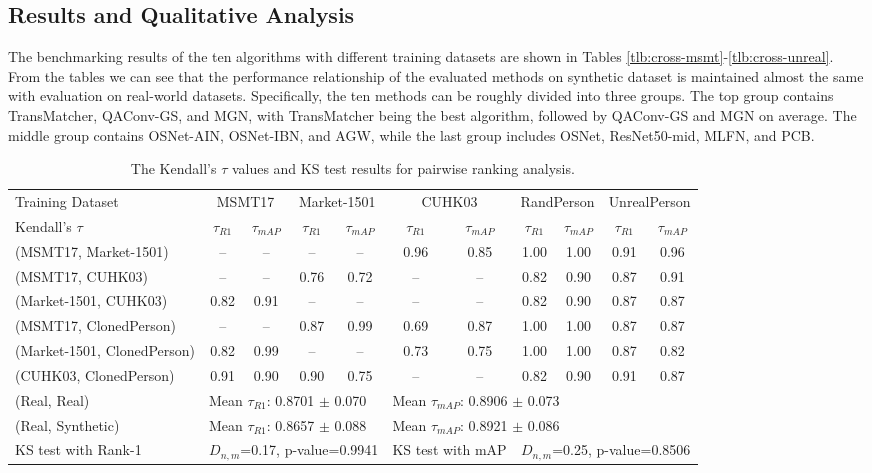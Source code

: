 \documentclass[10pt,twocolumn,letterpaper]{article}
\begin{document}
\subsection{Results and Qualitative Analysis}

The benchmarking results of the ten algorithms with different training datasets are shown in Tables \ref{tlb:cross-msmt}-\ref{tlb:cross-unreal}.
From the tables we can see that the performance relationship of the evaluated methods on synthetic dataset is maintained almost the same with evaluation on real-world datasets. Specifically, the ten methods can be roughly divided into three groups. The top group contains TransMatcher, QAConv-GS, and MGN, with TransMatcher being the best algorithm, followed by QAConv-GS and MGN on average. The middle group contains OSNet-AIN, OSNet-IBN, and AGW, while the last group includes OSNet, ResNet50-mid, MLFN, and PCB.



\begin{table*}
\centering
\begin{tabular}{|l@{}|c c|c c|c c|c c|c c|}
\hline
Training Dataset& \multicolumn{2}{c|}{MSMT17} & \multicolumn{2}{c|}{Market-1501}& \multicolumn{2}{c|}{CUHK03}& \multicolumn{2}{c|}{RandPerson}& \multicolumn{2}{c|}{UnrealPerson} \\ 

Kendall's $\tau$ & $\tau_{R1}$ & $\tau_{mAP}$& $\tau_{R1}$ & $\tau_{mAP}$& $\tau_{R1}$ & $\tau_{mAP}$& $\tau_{R1}$ & $\tau_{mAP}$& $\tau_{R1}$ & $\tau_{mAP}$ \\ \hline
(MSMT17, Market-1501)   & -- & -- & -- & -- & 0.96 & 0.85 & 1.00 & 1.00 & 0.91 & 0.96 \\
(MSMT17, CUHK03)       & -- & -- & 0.76 & 0.72 & -- & -- & 0.82 & 0.90 & 0.87 & 0.91 \\ 
(Market-1501, CUHK03)   & 0.82 & 0.91 & -- & -- & -- & -- & 0.82 & 0.90 & 0.87 & 0.87 \\ \hline
(MSMT17, ClonedPerson) & -- & -- & 0.87 & 0.99 & 0.69 & 0.87 & 1.00 & 1.00& 0.87 & 0.87 \\ 
(Market-1501, ClonedPerson)    & 0.82 & 0.99 & -- & -- & 0.73 & 0.75 & 1.00 & 1.00 & 0.87 & 0.82 \\ 
(CUHK03, ClonedPerson)        & 0.91 & 0.90 & 0.90 & 0.75 & -- & -- & 0.82 & 0.90 & 0.91 & 0.87 \\ 
\hline\hline
(Real, Real)         & \multicolumn{4}{l}{Mean $\tau_{R1}$: 0.8701 $\pm$ 0.070 } & \multicolumn{6}{|l|}{Mean $\tau_{mAP}$: 0.8906 $\pm$ 0.073}  \\   
(Real, Synthetic)    & \multicolumn{4}{l}{Mean $\tau_{R1}$: 0.8657 $\pm$ 0.088 } & \multicolumn{6}{|l|}{Mean $\tau_{mAP}$: 0.8921 $\pm$ 0.086}   \\  \hline 
KS test with Rank-1   & \multicolumn{4}{c}{$D_{n,m}$=0.17, p-value=0.9941} & \multicolumn{2}{|c}{KS test with mAP} & \multicolumn{4}{|c|}{$D_{n,m}$=0.25, p-value=0.8506 }    \\  \hline
\end{tabular}
\caption{The Kendall's $\tau$ values and KS test results for pairwise ranking analysis.}
\label{tlb:kenl-5task}
\end{table*}
\end{document}
